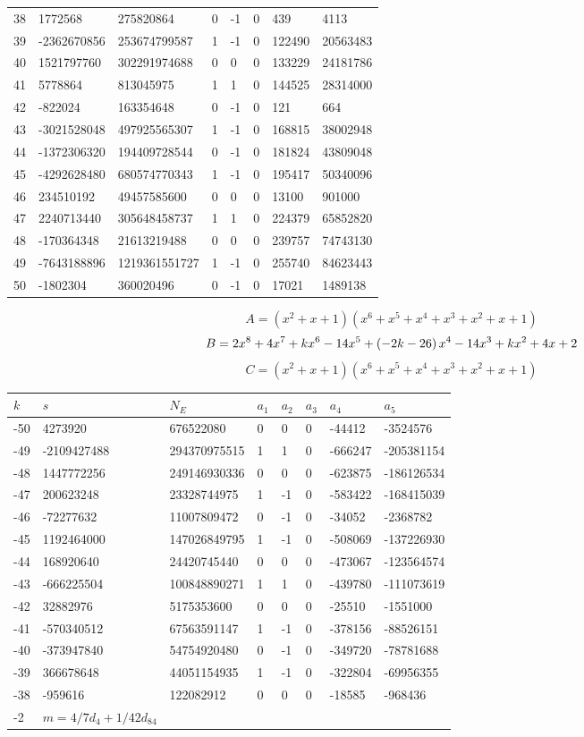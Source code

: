 \documentclass{amsart}
\begin{document}
\begin{longtable}{|l|l|l|lllll|}
38&1772568&275820864&0&-1&0&439&4113\\
39&-2362670856&253674799587&1&-1&0&122490&20563483\\
40&1521797760&302291974688&0&0&0&133229&24181786\\
41&5778864&813045975&1&1&0&144525&28314000\\
42&-822024&163354648&0&-1&0&121&664\\
43&-3021528048&497925565307&1&-1&0&168815&38002948\\
44&-1372306320&194409728544&0&-1&0&181824&43809048\\
45&-4292628480&680574770343&1&-1&0&195417&50340096\\
46&234510192&49457585600&0&0&0&13100&901000\\
47&2240713440&305648458737&1&1&0&224379&65852820\\
48&-170364348&21613219488&0&0&0&239757&74743130\\
49&-7643188896&1219361551727&1&-1&0&255740&84623443\\
50&-1802304&360020496&0&-1&0&17021&1489138\\
\hline
\end{longtable}
$$A=(x^2
 + x
 + 1)(x^6
 + x^5
 + x^4
 + x^3
 + x^2
 + x
 + 1)$$
$$B=2\*x^8
 + 4\*x^7
 + k\*x^6
 - 14\*x^5
 + \left(-2\*k
 - 26\right) \*x^4
 - 14\*x^3
 + k\*x^2
 + 4\*x
 + 2$$
$$C=(x^2
 + x
 + 1)(x^6
 + x^5
 + x^4
 + x^3
 + x^2
 + x
 + 1)$$
\begin{longtable}{|l|l|l|lllll|}
\hline
$k$ & $s$ & $N_E$ & $a_1$ & $a_2$ & $a_3$ & $a_4$ & $a_5$\\
\hline
-50&4273920&676522080&0&0&0&-44412&-3524576\\
-49&-2109427488&294370975515&1&1&0&-666247&-205381154\\
-48&1447772256&249146930336&0&0&0&-623875&-186126534\\
-47&200623248&23328744975&1&-1&0&-583422&-168415039\\
-46&-72277632&11007809472&0&-1&0&-34052&-2368782\\
-45&1192464000&147026849795&1&-1&0&-508069&-137226930\\
-44&168920640&24420745440&0&0&0&-473067&-123564574\\
-43&-666225504&100848890271&1&1&0&-439780&-111073619\\
-42&32882976&5175353600&0&0&0&-25510&-1551000\\
-41&-570340512&67563591147&1&-1&0&-378156&-88526151\\
-40&-373947840&54754920480&0&-1&0&-349720&-78781688\\
-39&366678648&44051154935&1&-1&0&-322804&-69956355\\
-38&-959616&122082912&0&0&0&-18585&-968436\\
-2&$m=4/7d_{4}+1/42d_{84}$&&\multicolumn{5}{c|}{}\\
\hline
\end{longtable}
\end{document}

